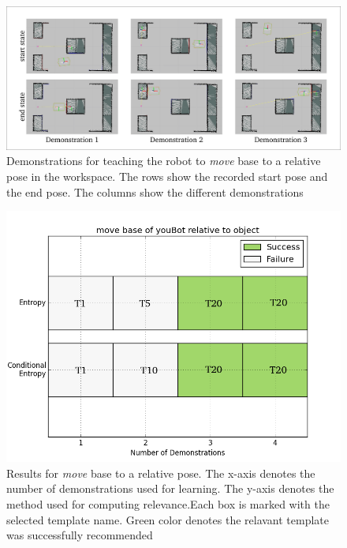 \begin{figure}[htp]
\centering
\includegraphics[scale=0.3]{images/base_relative_exp.png}
\caption[Demonstrations to teach the robot to move base to a relative location]
{Demonstrations for teaching the robot to \textit{move} base
to a relative pose in the workspace. The rows show the recorded start pose and the end pose. The 
columns show the different demonstrations}
\label{base relative exp}
\end{figure}
\begin{figure}[htp]
\centering
\includegraphics[scale=0.5]{images/base_relative_result.png}
\caption[Result : \textit{move} base relative pose to object  ]{Results for \textit{ move} base to a relative pose. The x-axis denotes the 
number of demonstrations used for learning. The y-axis denotes the method used for 
computing relevance.Each
box is marked with the selected template name. Green color denotes the relavant template was successfully recommended}
\label{base relative result}
\end{figure}

